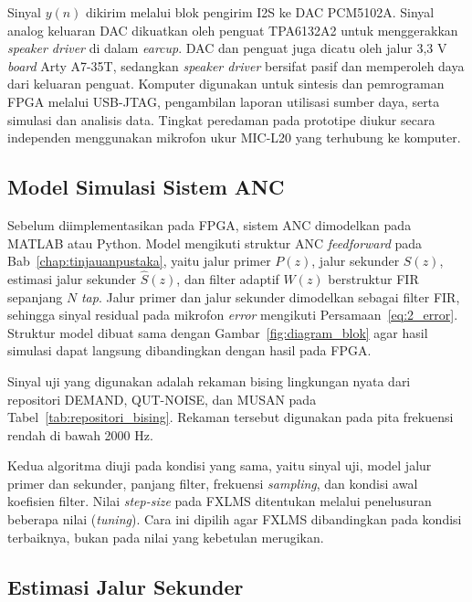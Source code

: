Sinyal $y(n)$ dikirim melalui blok pengirim I2S ke DAC PCM5102A. Sinyal analog keluaran DAC dikuatkan oleh penguat TPA6132A2 untuk menggerakkan \emph{speaker driver} di dalam \emph{earcup}. DAC dan penguat juga dicatu oleh jalur 3,3 V \emph{board} Arty A7-35T, sedangkan \emph{speaker driver} bersifat pasif dan memperoleh daya dari keluaran penguat. Komputer digunakan untuk sintesis dan pemrograman FPGA melalui USB-JTAG, pengambilan laporan utilisasi sumber daya, serta simulasi dan analisis data. Tingkat peredaman pada prototipe diukur secara independen menggunakan mikrofon ukur MIC-L20 yang terhubung ke komputer.

\subsection{Model Simulasi Sistem ANC}
\label{sec:model_simulasi}

Sebelum diimplementasikan pada FPGA, sistem ANC dimodelkan pada MATLAB atau Python. Model mengikuti struktur ANC \emph{feedforward} pada Bab~\ref{chap:tinjauanpustaka}, yaitu jalur primer $P(z)$, jalur sekunder $S(z)$, estimasi jalur sekunder $\hat{S}(z)$, dan filter adaptif $W(z)$ berstruktur FIR sepanjang $N$ \emph{tap}. Jalur primer dan jalur sekunder dimodelkan sebagai filter FIR, sehingga sinyal residual pada mikrofon \emph{error} mengikuti Persamaan~\eqref{eq:2_error}. Struktur model dibuat sama dengan Gambar~\ref{fig:diagram_blok} agar hasil simulasi dapat langsung dibandingkan dengan hasil pada FPGA.

Sinyal uji yang digunakan adalah rekaman bising lingkungan nyata dari repositori DEMAND, QUT-NOISE, dan MUSAN pada Tabel~\ref{tab:repositori_bising}. Rekaman tersebut digunakan pada pita frekuensi rendah di bawah 2000 Hz.

Kedua algoritma diuji pada kondisi yang sama, yaitu sinyal uji, model jalur primer dan sekunder, panjang filter, frekuensi \emph{sampling}, dan kondisi awal koefisien filter. Nilai \emph{step-size} pada FXLMS ditentukan melalui penelusuran beberapa nilai (\emph{tuning}). Cara ini dipilih agar FXLMS dibandingkan pada kondisi terbaiknya, bukan pada nilai yang kebetulan merugikan.

\subsection{Estimasi Jalur Sekunder}
\label{sec:estimasi_jalur_sekunder}

